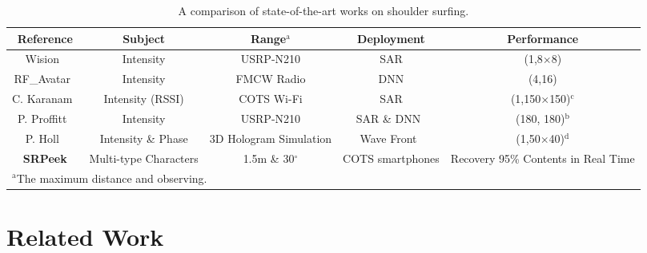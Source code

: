 \begin{table*}[t]
    \caption{A comparison of state-of-the-art works on shoulder surfing.}
    \vspace{2mm}
    \begin{center}
    \begin{tabular}{ccccc}
    \hline
     Reference & Subject & Range$^{\mathrm{a}}$ & Deployment & Performance\\ 
    \hline
    Wision~\cite{wision}  & Intensity & USRP-N210 & SAR & (1,8$\times$8)\\ 
    RF\_Avatar~\cite{rf_avatar}  & Intensity & FMCW Radio & DNN & (4,16)\\ 
    C. Karanam~\cite{3dimaging_uav} & Intensity (RSSI) & COTS Wi-Fi & SAR & (1,150$\times$150)$^{\mathrm{c}}$\\ 
    P. Proffitt~\cite{imaging_1} & Intensity & USRP-N210 & SAR \& DNN~\cite{MaskRCNN} & (180, 180)$^{\mathrm{b}}$\\ 
    P. Holl~\cite{holography} & Intensity \& Phase & 3D Hologram Simulation & Wave Front~\cite{angular} & (1,50$\times$40)$^{\mathrm{d}}$\\ 
    \hline
    \textbf{\textsf{SRPeek}} & Multi-type Characters & 1.5m \& 30$^\circ$ & COTS smartphones & Recovery 95\% Contents in Real Time \\
    \hline
    \multicolumn{5}{l}{$^{\mathrm{a}}$The maximum distance and observing.}\\
    \end{tabular}
    \label{comparison}
    \end{center}
\end{table*}

\section{Related Work}
\label{sec-related-work}

